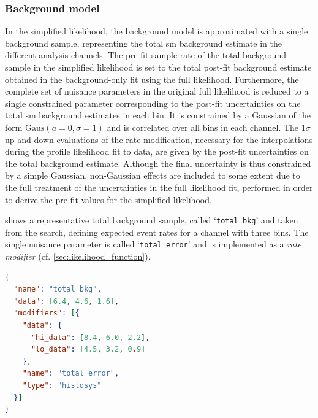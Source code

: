 \subsubsection{Background model}

In the simplified likelihood, the background model is approximated with a single background sample, representing the total \gls{sm} background estimate in the different analysis channels.
The pre-fit sample rate of the total background sample in the simplified likelihood is set to the total post-fit background estimate obtained in the background-only fit using the full likelihood.
Furthermore, the complete set of nuisance parameters in the original full likelihood is reduced to a single constrained parameter corresponding to the post-fit uncertainties on the total \gls{sm} background estimates in each bin.
It is constrained by a Gaussian of the form $\mathrm{Gaus}(a = 0, \sigma = 1)$ and is correlated over all bins in each channel. The $1\sigma$ up and down evaluations of the rate modification, necessary for the interpolations during the profile likelihood fit to data, are given by the post-fit uncertainties on the total background estimate.
Although the final uncertainty is thus constrained by a simple Gaussian, non-Gaussian effects are included to some extent due to the full treatment of the uncertainties in the full likelihood fit, performed in order to derive the pre-fit values for the simplified likelihood.

 shows a representative total background sample, called `\texttt{total\_bkg}' and taken from the \onelepton search, defining expected event rates for a channel with three bins. The single nuisance parameter is called `\texttt{total\_error}' and is implemented as a \textit{rate modifier} (cf. \cref{sec:likelihood_function}).

\begin{minipage}{\linewidth}
\begin{lstlisting}[language=json,firstnumber=1,caption={Representative total background sample with sample rate and total uncertainty for three separate bins, derived from a fit in the \glspl{sr} and \glspl{cr} using the full likelihood. The \texttt{histosys} type modifier in \lib{HistFactory} implements a shape uncertainty correlated over all bins.},captionpos=b, label=lst:bkg_sample]
{
  "name": "total_bkg",
  "data": [6.4, 4.6, 1.6],
  "modifiers": [{
    "data": {
      "hi_data": [8.4, 6.0, 2.2], 
      "lo_data": [4.5, 3.2, 0.9]
    }, 
    "name": "total_error",
    "type": "histosys"
  }]
}
\end{lstlisting}
\end{minipage}

